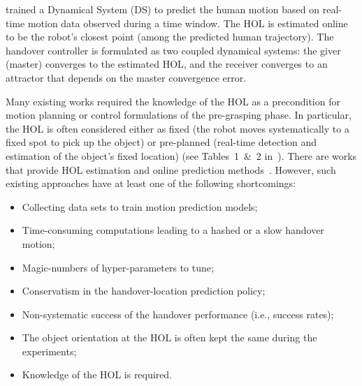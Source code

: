 \cite{medina2016humanoids} trained a Dynamical System (DS) to predict the human motion based on real-time motion data observed during a time window. The HOL is estimated online to be the robot's closest point (among the predicted human trajectory). 
The handover controller is formulated as two coupled dynamical systems: the giver (master) converges to the estimated HOL, and the receiver converges to an attractor that depends on the master convergence error.



Many existing works required the knowledge of the HOL as a precondition for motion planning or control formulations of the pre-grasping phase. In particular, the HOL is often considered either as fixed (the robot moves systematically to a fixed spot to pick up the object) or pre-planned (real-time detection and estimation of the object's fixed location) (see Tables~1~\&~2 in~\cite{ortenzi2021tro}). There are works that provide HOL estimation and online prediction methods~\cite{prada2014iros,medina2016humanoids,vahrenkamp2016humanoids,maeda2017autonomousRobots,widmann2018ecc,nemlekar2019icra}. However, such existing approaches have at least one of the following shortcomings:
\begin{itemize}
	\item Collecting data sets to train motion prediction models;
	\item Time-consuming computations leading to a hashed or a slow handover motion; 
	\item Magic-numbers of hyper-parameters to tune;
	\item Conservatism in the handover-location prediction policy; 
	\item Non-systematic success of the handover performance (i.e., success rates);
	\item The object orientation at the HOL is often kept the same during the experiments;
	\item Knowledge of the HOL is required.
\end{itemize}
